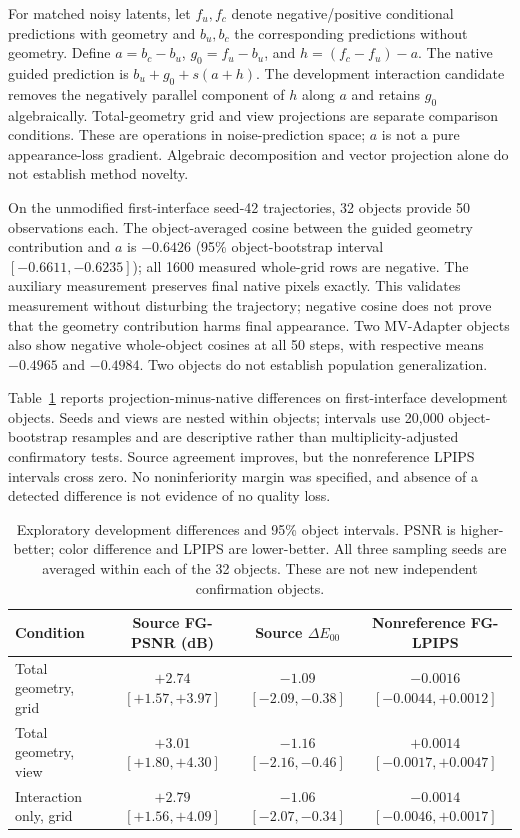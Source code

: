 \documentclass[11pt]{article}
\begin{document}
For matched noisy latents, let $f_u,f_c$ denote negative/positive conditional
predictions with geometry and $b_u,b_c$ the corresponding predictions without
geometry. Define $a=b_c-b_u$, $g_0=f_u-b_u$, and
$h=(f_c-f_u)-a$. The native guided prediction is $b_u+g_0+s(a+h)$.
The development interaction candidate removes the negatively parallel component
of $h$ along $a$ and retains $g_0$ algebraically. Total-geometry grid and
view projections are separate comparison conditions. These are operations in
noise-prediction space; $a$ is not a pure appearance-loss gradient. Algebraic
decomposition and vector projection alone do not establish method novelty.

On the unmodified first-interface seed-42 trajectories, 32 objects provide
50 observations each. The object-averaged cosine between the guided geometry
contribution and $a$ is $-0.6426$ (95\% object-bootstrap interval
$[-0.6611,-0.6235]$); all 1600 measured whole-grid rows are negative.
The auxiliary measurement preserves final native pixels exactly. This validates
measurement without disturbing the trajectory; negative cosine does not prove
that the geometry contribution harms final appearance. Two MV-Adapter objects
also show negative whole-object cosines at all 50 steps, with respective means
$-0.4965$ and $-0.4984$. Two objects do not establish population generalization.

Table~\ref{tab:development012} reports projection-minus-native differences on
first-interface development objects. Seeds and views are nested within objects;
intervals use 20,000 object-bootstrap resamples and are descriptive rather than
multiplicity-adjusted confirmatory tests. Source agreement improves, but the
nonreference LPIPS intervals cross zero. No noninferiority margin was specified,
and absence of a detected difference is not evidence of no quality loss.

\begin{table}[ht]
\centering\scriptsize
\begin{tabular}{lccc}
\toprule
Condition & Source FG-PSNR (dB) & Source $\Delta E_{00}$ & Nonreference FG-LPIPS \\
\midrule
Total geometry, grid & $+2.74$ $[+1.57,+3.97]$ & $-1.09$ $[-2.09,-0.38]$ & $-0.0016$ $[-0.0044,+0.0012]$ \\
Total geometry, view & $+3.01$ $[+1.80,+4.30]$ & $-1.16$ $[-2.16,-0.46]$ & $+0.0014$ $[-0.0017,+0.0047]$ \\
Interaction only, grid & $+2.79$ $[+1.56,+4.09]$ & $-1.06$ $[-2.07,-0.34]$ & $-0.0014$ $[-0.0046,+0.0017]$ \\
\bottomrule
\end{tabular}
\caption{Exploratory development differences and 95\% object intervals.
PSNR is higher-better; color difference and LPIPS are lower-better. All three
sampling seeds are averaged within each of the 32 objects. These are not new
independent confirmation objects.}
\label{tab:development012}
\end{table}
\end{document}
